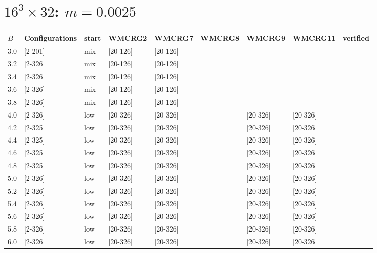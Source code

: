 \documentclass{article}
\begin{document}
  \section*{$16^3\times32$:  $m=0.0025$}
    \begin{tabular}{| l | l | l | l | l | l | l | l | l |}
      \hline
      $B$ & Configurations & start & WMCRG2 & WMCRG7 & WMCRG8 & WMCRG9 & WMCRG11 & verified\\
      \hline
      3.0 & [2-201] & mix & [20-126] & [20-126] &  &  &  &\\
      3.2 & [2-326] & mix & [20-126] & [20-126] &  &  &  &\\
      3.4 & [2-326] & mix & [20-126] & [20-126] &  &  &  &\\
      3.6 & [2-326] & mix & [20-126] & [20-126] &  &  &  &\\
      3.8 & [2-326] & mix & [20-126] & [20-126] &  &  &  &\\
      4.0 & [2-326] & low & [20-326] & [20-326] &  & [20-326] & [20-326] &\\
      4.2 & [2-325] & low & [20-326] & [20-326] &  & [20-326] & [20-326] &\\
      4.4 & [2-325] & low & [20-326] & [20-326] &  & [20-326] & [20-326] &\\
      4.6 & [2-325] & low & [20-326] & [20-326] &  & [20-326] & [20-326] &\\
      4.8 & [2-325] & low & [20-326] & [20-326] &  & [20-326] & [20-326] &\\
      5.0 & [2-326] & low & [20-326] & [20-326] &  & [20-326] & [20-326] &\\
      5.2 & [2-326] & low & [20-326] & [20-326] &  & [20-326] & [20-326] &\\
      5.4 & [2-326] & low & [20-326] & [20-326] &  & [20-326] & [20-326] &\\
      5.6 & [2-326] & low & [20-326] & [20-326] &  & [20-326] & [20-326] &\\
      5.8 & [2-326] & low & [20-326] & [20-326] &  & [20-326] & [20-326] &\\
      6.0 & [2-326] & low & [20-326] & [20-326] &  & [20-326] & [20-326] &\\
      \hline
    \end{tabular}
\end{document}
